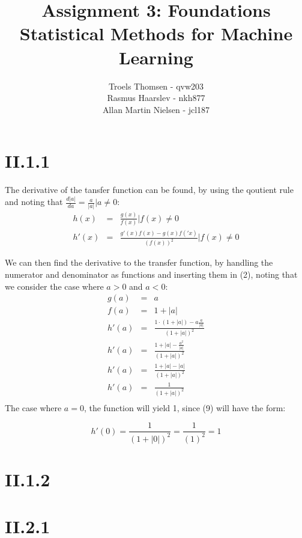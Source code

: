 \documentclass[12pt, a4paper]{article}
\title{Assignment 3: Foundations\\Statistical Methods for Machine Learning}
\author{Troels Thomsen - qvw203\\Rasmus Haarslev - nkh877\\Allan Martin Nielsen - jcl187}
\begin{document}
\pagestyle{empty}
\maketitle
{}
\newpage

\tableofcontents
\newpage

\pagestyle{fancy}

\section{II.1.1}
The derivative of the tansfer function can be found, by using the qoutient rule and noting that $\frac{d|a|}{da}=\frac{a}{|a|}|a\neq 0$:\\
\begin{eqnarray}
	h(x) &=& \frac{g(x)}{f(x)} | f(x) \neq 0\\
	h'(x) &=& \frac{g'(x)f(x)-g(x)f('x)}{(f(x))^2} | f(x) \neq 0
\end{eqnarray}
 
We can then find the derivative to the transfer function, by handling the numerator and denominator as functions and inserting them in (2), noting that we consider the case where $a>0$ and $a<0$:
\begin{eqnarray}
	g(a) &=& a\\
	f(a) &=& 1+|a|\\
	h'(a) &=& \frac{1\cdot (1+|a|)-a\frac{a}{|a|}}{(1+|a|)^2}\\
	h'(a) &=& \frac{1+|a|-\frac{a^2}{|a|}}{(1+|a|)^2}\\
	h'(a) &=& \frac{1+|a|-|a|}{(1+|a|)^2}\\
	h'(a) &=& \frac{1}{(1+|a|)^2}\\
\end{eqnarray}
The case where $a=0$, the function will yield 1, since (9) will have the form:

\begin{equation}
	h'(0) = \frac{1}{(1+|0|)^2} = \frac{1}{(1)^2} = 1
\end{equation}

\section{II.1.2}
\section{II.2.1}
\end{document}
